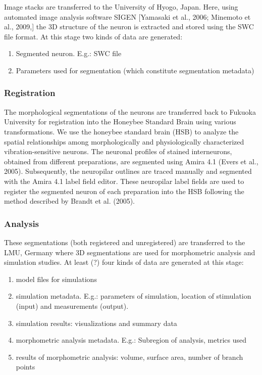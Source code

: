\documentclass{frontiersSCNS} %
\begin{document}
Image stacks are transferred to the University of Hyogo, Japan. Here, using
automated image analysis software SIGEN [Yamasaki et al., 2006; Minemoto et
al., 2009,] the 3D structure of the neuron is extracted and stored using the
SWC file format. At this stage two kinds of data are generated:

\begin{enumerate}
\item Segmented neuron. E.g.: SWC file
\item Parameters used for segmentation (which constitute segmentation metadata)
\end{enumerate}


\subsubsection{Registration}

The morphological segmentations of the neurons are transferred back to Fukuoka
University for registration into the Honeybee Standard Brain using various
transformations. We use the honeybee standard brain (HSB) to analyze the
spatial relationships among morphologically and physiologically characterized
vibration-sensitive neurons. The neuronal profiles of stained interneurons,
obtained from different preparations, are segmented  using Amira 4.1 (Evers et
al., 2005). Subsequently, the neuropilar outlines are traced manually and
segmented with the Amira 4.1 label field editor. These neuropilar label fields
are used to register the segmented neuron of each preparation into the HSB
following the method described by Brandt et al. (2005).


\subsubsection{Analysis}

These segmentations  (both registered and unregistered) are transferred to the
LMU, Germany where 3D segmentations are used for morphometric analysis and
simulation studies. At least (?) four kinds of data are generated at this
stage:

\begin{enumerate}
\item model files for simulations
\item simulation metadata. E.g.: parameters of simulation, location of stimulation (input) and measurements (output).
\item simulation results: visualizations and summary data
\item morphometric analysis metadata. E.g.: Subregion of analysis, metrics used
\item results of morphometric analysis: volume, surface area, number of branch points
\end{enumerate}
\end{document}

